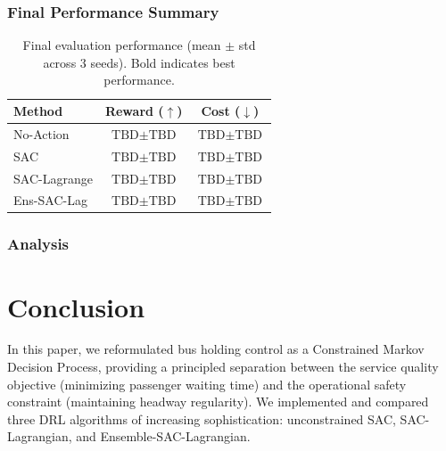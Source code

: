 \documentclass[10pt]{article}
\begin{document}
\subsubsection{Final Performance Summary}

\begin{table}[h]
\centering
\caption{Final evaluation performance (mean $\pm$ std across 3 seeds). Bold indicates best performance.}
\label{tab:results}
\begin{tabular}{lcc}
\toprule
Method & Reward ($\uparrow$) & Cost ($\downarrow$) \\
\midrule
No-Action     & $\text{TBD} \pm \text{TBD}$ & $\text{TBD} \pm \text{TBD}$ \\
SAC           & $\text{TBD} \pm \text{TBD}$ & $\text{TBD} \pm \text{TBD}$ \\
SAC-Lagrange  & $\text{TBD} \pm \text{TBD}$ & $\text{TBD} \pm \text{TBD}$ \\
Ens-SAC-Lag   & $\text{TBD} \pm \text{TBD}$ & $\text{TBD} \pm \text{TBD}$ \\
\bottomrule
\end{tabular}
\end{table}

\subsubsection{Analysis}



\section{Conclusion}
\label{sec:conclusion}

In this paper, we reformulated bus holding control as a Constrained Markov Decision Process, providing a principled separation between the service quality objective (minimizing passenger waiting time) and the operational safety constraint (maintaining headway regularity). We implemented and compared three DRL algorithms of increasing sophistication: unconstrained SAC, SAC-Lagrangian, and Ensemble-SAC-Lagrangian.
\end{document}
